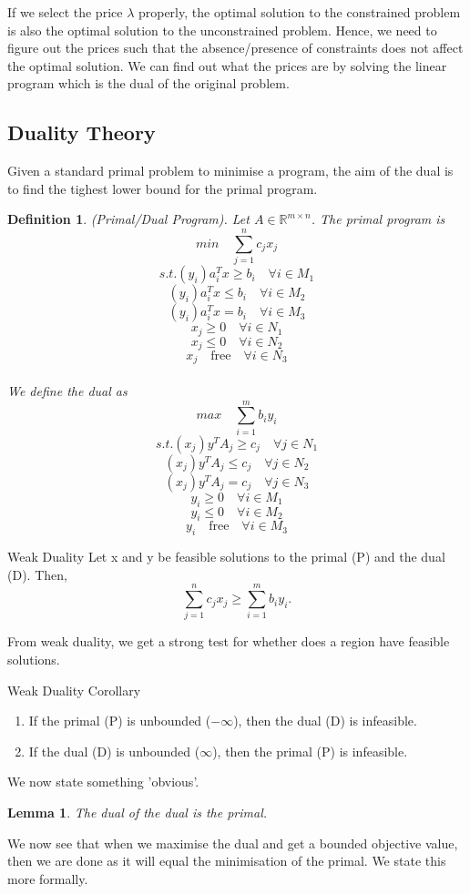 \documentclass[twoside]{article}
\newtheorem{lemma}[theorem]{Lemma}
\newtheorem{definition}[theorem]{Definition}
\begin{document}
If we select the price $\lambda$ properly, the optimal solution to the constrained problem is also the optimal solution to the unconstrained problem. Hence, we need to figure out the prices such that the absence/presence of constraints does not affect the optimal solution. We can find out what the prices are by solving the linear program which is the dual of the original problem.

\subsection{Duality Theory}

Given a standard primal problem to minimise a program, the aim of the dual is to find the tighest lower bound for the primal program. 

\begin{definition}(Primal/Dual Program). Let $A \in \mathbb{R}^{m \times n}$. The primal program is 
$$
min \quad \sum_{j=1}^nc_jx_j
$$
$$
s.t. (y_i) a_i^Tx \geq b_i \quad \forall i \in M_1
$$
$$
(y_i) a_i^Tx \leq b_i \quad \forall i \in M_2
$$
$$
(y_i) a_i^Tx = b_i \quad \forall i \in M_3
$$
$$
x_j \geq 0 \quad \forall i \in N_1
$$
$$
x_j \leq 0 \quad \forall i \in N_2
$$
$$
x_j \quad \text{free} \quad \forall i \in N_3
$$
\\We define the dual as 
$$
max \quad \sum_{i=1}^mb_iy_i
$$
$$
s.t. (x_j) y^TA_j \geq c_j \quad \forall j \in N_1
$$
$$
(x_j) y^TA_j \leq c_j \quad \forall j \in N_2
$$
$$
(x_j) y^TA_j = c_j \quad \forall j \in N_3
$$
$$
y_i \geq 0 \quad \forall i \in M_1
$$
$$
y_i \leq 0 \quad \forall i \in M_2
$$
$$
y_i \quad \text{free} \quad \forall i \in M_3
$$
\end{definition}

\begin{theorem_exam}{Weak Duality}{} Let x and y be feasible solutions to the primal (P) and the dual (D). Then, 
$$
\sum_{j=1}^nc_jx_j \geq \sum_{i=1}^mb_iy_i.
$$
\end{theorem_exam}

From weak duality, we get a strong test for whether does a region have feasible solutions.

\begin{proposition_exam}{Weak Duality Corollary}{}
\begin{enumerate}
\item If the primal (P) is unbounded ($-\infty$), then the dual (D) is infeasible.
\item If the dual (D) is unbounded ($\infty$), then the primal (P) is infeasible.
\end{enumerate}
\end{proposition_exam}
We now state something 'obvious'.
\begin{lemma}The dual of the dual is the primal.
\end{lemma}
We now see that when we maximise the dual and get a bounded objective value, then we are done as it will equal the minimisation of the primal. We state this more formally.
\end{document}
